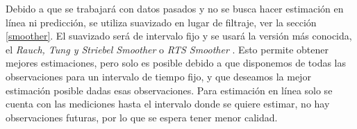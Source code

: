 
Debido a que se trabajará con datos pasados y no se busca hacer estimación en línea ni predicción, se utiliza suavizado en lugar de filtraje, ver la sección \ref{smoother}. El suavizado será de intervalo fijo y se usará la versión más conocida, el \textit{Rauch, Tung y Striebel Smoother} o \textit{RTS Smoother}  \cite{Rauch1965}\cite{Simon2006}. Esto permite obtener mejores estimaciones, pero solo es posible debido a que disponemos de todas las observaciones para un intervalo de tiempo fijo, y que deseamos la mejor estimación posible dadas esas observaciones. Para estimación en línea solo se cuenta con las mediciones hasta el intervalo donde se quiere estimar, no hay observaciones futuras, por lo que se espera tener menor calidad.







